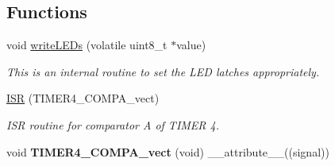 \subsection*{Functions}
\begin{DoxyCompactItemize}
\item 
void \hyperlink{group___engduino_l_e_ds_ga6c316c07af6042f29e718c5a5b2ea656}{write\+L\+E\+Ds} (volatile uint8\+\_\+t $\ast$value)
\begin{DoxyCompactList}\small\item\em This is an internal routine to set the L\+E\+D latches appropriately. \end{DoxyCompactList}\item 
\hyperlink{group___engduino_l_e_ds_ga8aa6a32130ab26be17555166513a23ba}{I\+S\+R} (T\+I\+M\+E\+R4\+\_\+\+C\+O\+M\+P\+A\+\_\+vect)
\begin{DoxyCompactList}\small\item\em I\+S\+R routine for comparator A of T\+I\+M\+E\+R 4. \end{DoxyCompactList}\item 
\hypertarget{group___engduino_l_e_ds_gaeceaff5170a5076a831c697b154c00f2}{}void {\bfseries T\+I\+M\+E\+R4\+\_\+\+C\+O\+M\+P\+A\+\_\+vect} (void) \+\_\+\+\_\+attribute\+\_\+\+\_\+((signal))\label{group___engduino_l_e_ds_gaeceaff5170a5076a831c697b154c00f2}


\end{DoxyCompactItemize}
